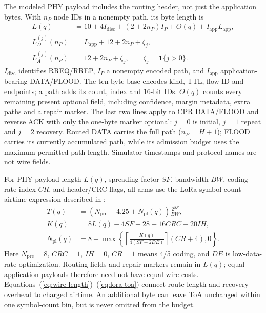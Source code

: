 \documentclass[conference,letterpaper,10pt]{IEEEtran}
\begin{document}
The modeled PHY payload includes the routing header, not just the
application bytes. With $n_P$ node IDs in a nonempty path, its byte length is
\begin{equation}
\begin{aligned}
L(q)&=10+4I_{\mathrm{disc}}+(2+2n_P)I_P
       +O(q)+I_{\mathrm{app}}L_{\mathrm{app}},\\
L_D^{(j)}(n_P)&=L_{\mathrm{app}}+12+2n_P+\zeta_j,\\
L_A^{(j)}(n_P)&=12+2n_P+\zeta_j,\qquad
 \zeta_j=\mathbf 1\{j>0\}.
\end{aligned}
\label{eq:wire-length}
\end{equation}
$I_{\mathrm{disc}}$ identifies RREQ/RREP, $I_P$ a nonempty encoded path,
and $I_{\mathrm{app}}$ application-bearing DATA/FLOOD. The ten-byte base
encodes kind, TTL, flow ID and endpoints; a path adds its count, index and
16-bit IDs. $O(q)$ counts every remaining present optional field, including
confidence, margin metadata, extra paths and a repair marker. The last two
lines apply to CPR DATA/FLOOD and reverse ACK with only the one-byte marker
optional: $j=0$ is initial, $j=1$ repeat and $j=2$ recovery. Routed DATA
carries the full path ($n_P=H+1$); FLOOD carries its currently accumulated
path, while its admission budget uses the maximum permitted path length.
Simulator timestamps and protocol names are not wire fields.

For PHY payload length $L(q)$, spreading factor $SF$, bandwidth $BW$,
coding-rate index $CR$, and header/CRC flags, all arms use the LoRa
symbol-count airtime expression described in \cite{augustin2016study}:
\begin{equation}
\begin{aligned}
T(q)&=\left(N_{\mathrm{pre}}+4.25+N_{\mathrm{pl}}(q)\right)
       \frac{2^{SF}}{BW},\\
K(q)&=8L(q)-4SF+28+16CRC-20IH,\\
N_{\mathrm{pl}}(q)&=8+\max\!\left\{
 \left\lceil\frac{K(q)}{4(SF-2DE)}\right\rceil(CR+4),0\right\}.
\end{aligned}
\label{eq:lora-toa}
\end{equation}
Here $N_{\mathrm{pre}}=8$, $CRC=1$, $IH=0$, $CR=1$ means 4/5 coding, and
$DE$ is low-data-rate optimization. Routing fields and repair markers remain
in $L(q)$; equal application payloads therefore need not have equal wire costs.
Equations~(\ref{eq:wire-length})--(\ref{eq:lora-toa}) connect route length
and recovery overhead to charged airtime. An additional byte can leave ToA
unchanged within one symbol-count bin, but is never omitted from the budget.
\end{document}
